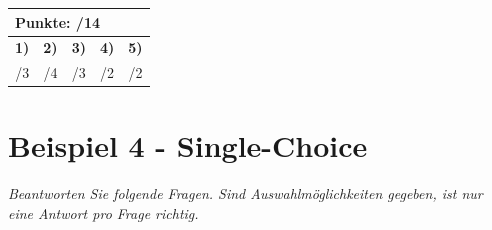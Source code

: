 \documentclass[11pt, a4paper]{article}
\begin{document}
\vfill
\begin{flushright}
\renewcommand{\arraystretch}{1.23}
\begin{tabular}{|c | c | c | c | c|}
\hline
\multicolumn{5}{|l|}{\textbf{\large{Punkte: \quad\quad\quad /14}}}\\
\hline
\textbf{1)} & \textbf{2)} & \textbf{3)} & \textbf{4)} & \textbf{5)} \\
\quad/3 & \quad/4 & \quad/3 & \quad/2 & \quad/2 \\
\hline
\end{tabular}
\end{flushright}

\newpage
\null
\thispagestyle{empty}
\newpage

\section*{Beispiel 4 - Single-Choice}
\textit{Beantworten Sie folgende Fragen. Sind Auswahlmöglichkeiten gegeben, ist nur eine Antwort pro Frage richtig.}
\end{document}
